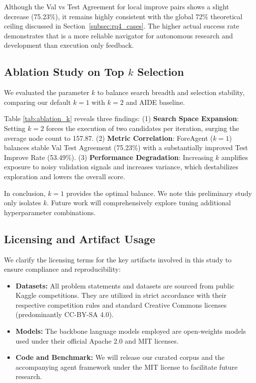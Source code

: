 Although the Val vs Test Agreement for local improve pairs shows a slight decrease (75.23\%), it remains highly consistent with the global 72\% theoretical ceiling discussed in Section~\ref{subsec:rq4_cases}.
The higher actual success rate demonstrates that \ours is a more reliable navigator for autonomous research and development than execution only feedback.


\subsection{Ablation Study on Top $k$ Selection}
\label{app:ablation_k}

We evaluated the parameter $k$ to balance search breadth and selection stability, comparing our default $k=1$ with $k=2$ and AIDE baseline.

Table \ref{tab:ablation_k} reveals three findings: (1) \textbf{Search Space Expansion}: Setting $k=2$ forces the execution of two candidates per iteration, surging the average node count to 157.87. (2) \textbf{Metric Correlation}: ForeAgent ($k=1$) balances stable Val Test Agreement (75.23\%) with a substantially improved Test Improve Rate (53.49\%). (3) \textbf{Performance Degradation}: Increasing $k$ amplifies exposure to noisy validation signals and increases variance, which destabilizes exploration and lowers the overall score.

In conclusion, $k=1$ provides the optimal balance.
We note this preliminary study only isolates $k$.
Future work will comprehensively explore tuning additional hyperparameter combinations.


\subsection{Licensing and Artifact Usage}
\label{app:license}

We clarify the licensing terms for the key artifacts involved in this study to ensure compliance and reproducibility:

\begin{itemize}
    \item \textbf{Datasets:} All problem statements and datasets are sourced from public Kaggle competitions. They are utilized in strict accordance with their respective competition rules and standard Creative Commons licenses (predominantly CC-BY-SA 4.0).
    \item \textbf{Models:} The backbone language models employed are open-weights models used under their official Apache 2.0 and MIT licenses.
    \item \textbf{Code and Benchmark:} We will release our curated corpus and the accompanying agent framework under the MIT license to facilitate future research.
\end{itemize}

